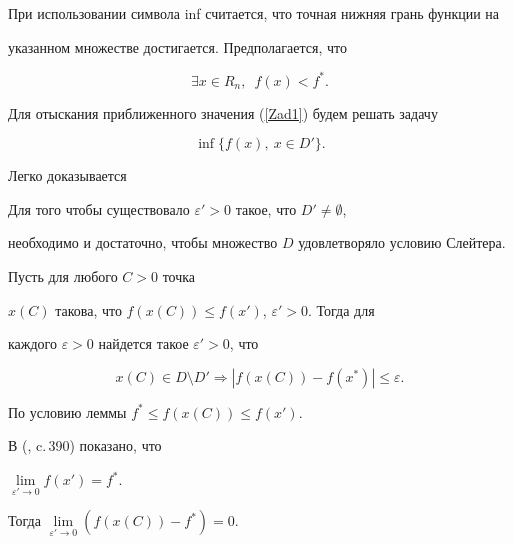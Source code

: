 При использовании символа inf считается, что точная нижняя грань функции на 


указанном множестве достигается. Предполагается, что


\begin{equation}\label{Predp} 


\exists x\in R_n,\ \; f(x)<f^*.


\end{equation}


Для отыскания приближенного значения (\ref{Zad1}) будем решать задачу


\begin{equation}\label{Zad2} 


\inf\{f(x),\ x\in D'\}.


\end{equation}


Легко доказывается





\begin{lem}


Для того чтобы существовало $\varepsilon'>0$ такое, что $D'\ne\emptyset$,


необходимо и достаточно, чтобы множество $D$ удовлетворяло условию Слейтера.


\end{lem}





\begin{lem}


Пусть для любого $C>0$ точка 


$x(C)$ такова, что $f(x(C))\leq f(x')$, $\varepsilon'>0$. Тогда для 


каждого $\varepsilon>0$ найдется такое $\varepsilon'>0$, что


$$


x(C)\in D\setminus D' \Longrightarrow |f(x(C))-f(x^*)|\leq\varepsilon.


$$


\end{lem}





\begin{pf}


По условию леммы $f^*\leq f(x(C))\leq f(x')$.


В (\cite{Vas}, c.\,390) показано, что


$\lim\limits_{\varepsilon'\to 0}f(x')=f^*$.


Тогда $\lim\limits_{\varepsilon'\to 0}


(f(x(C))-f^*)=0$.


\end{pf}





